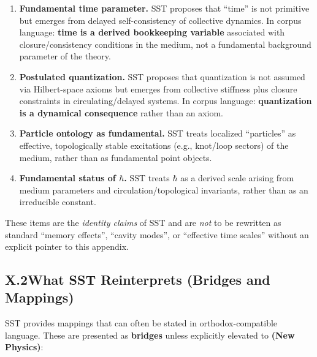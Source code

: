 \documentclass[11pt]{article}
\begin{document}
            \begin{enumerate}
                \item \textbf{Fundamental time parameter.}
                SST proposes that ``time'' is not primitive but emerges from delayed self-consistency of collective dynamics. In corpus language: \textbf{time is a derived bookkeeping variable} associated with closure/consistency conditions in the medium, not a fundamental background parameter of the theory.

                \item \textbf{Postulated quantization.}
                SST proposes that quantization is not assumed via Hilbert-space axioms but emerges from collective stiffness plus closure constraints in circulating/delayed systems. In corpus language: \textbf{quantization is a dynamical consequence} rather than an axiom.

                \item \textbf{Particle ontology as fundamental.}
                SST treats localized ``particles'' as effective, topologically stable excitations (e.g., knot/loop sectors) of the medium, rather than as fundamental point objects.

                \item \textbf{Fundamental status of \(\hbar\).}
                SST treats \(\hbar\) as a derived scale arising from medium parameters and circulation/topological invariants, rather than as an irreducible constant.
            \end{enumerate}

            \noindent These items are the \emph{identity claims} of SST and are \emph{not} to be rewritten as standard ``memory effects'', ``cavity modes'', or ``effective time scales'' without an explicit pointer to this appendix.

        \subsection*{X.2\quad What SST Reinterprets (Bridges and Mappings)}
            SST provides mappings that can often be stated in orthodox-compatible language. These are presented as \textbf{bridges} unless explicitly elevated to \textbf{(New Physics)}:
\end{document}
